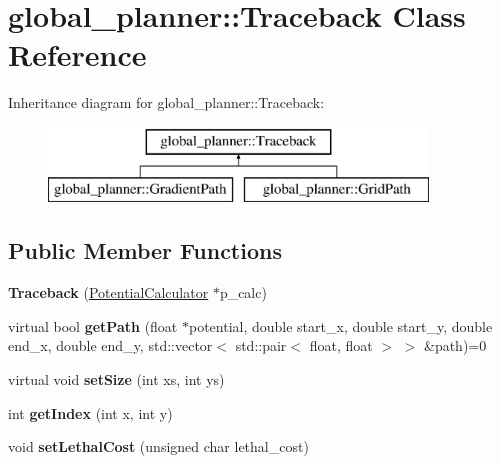 \hypertarget{classglobal__planner_1_1_traceback}{}\section{global\+\_\+planner\+:\+:Traceback Class Reference}
\label{classglobal__planner_1_1_traceback}
Inheritance diagram for global\+\_\+planner\+:\+:Traceback\+:\begin{figure}[H]
\begin{center}
\leavevmode
\includegraphics[height=2.000000cm]{classglobal__planner_1_1_traceback}
\end{center}
\end{figure}
\subsection*{Public Member Functions}
\begin{DoxyCompactItemize}
\item 
\mbox{\label{classglobal__planner_1_1_traceback_abf48245c8bc021ba9df355ae74ded3e4}} 
{\bfseries Traceback} (\mbox{\hyperlink{classglobal__planner_1_1_potential_calculator}{Potential\+Calculator}} $\ast$p\+\_\+calc)
\item 
\mbox{\label{classglobal__planner_1_1_traceback_ad3562c3ff5dc3a1e4465d2ddbe62f812}} 
virtual bool {\bfseries get\+Path} (float $\ast$potential, double start\+\_\+x, double start\+\_\+y, double end\+\_\+x, double end\+\_\+y, std\+::vector$<$ std\+::pair$<$ float, float $>$ $>$ \&path)=0
\item 
\mbox{\label{classglobal__planner_1_1_traceback_a75fa8c3628baa7debd94ac83b02e03a7}} 
virtual void {\bfseries set\+Size} (int xs, int ys)
\item 
\mbox{\label{classglobal__planner_1_1_traceback_a9565bfa976f8ce019ce4e4d814b3b575}} 
int {\bfseries get\+Index} (int x, int y)
\item 
\mbox{\label{classglobal__planner_1_1_traceback_af411eb96102bcedea2d530137b13a002}} 
void {\bfseries set\+Lethal\+Cost} (unsigned char lethal\+\_\+cost)
\end{DoxyCompactItemize}
